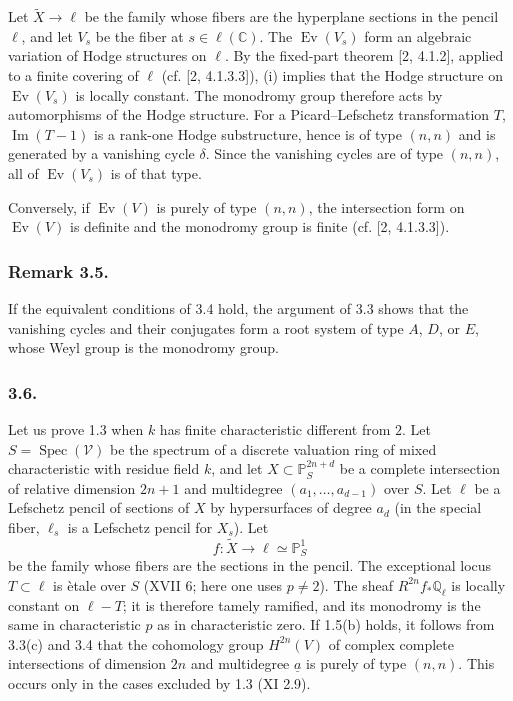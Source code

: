 Let $\widetilde X\to\ell$ be the family whose fibers are the hyperplane
sections in the pencil $\ell$, and let $V_s$ be the fiber at
$s\in\ell(\mathbb C)$.  The $\operatorname{Ev}(V_s)$ form an algebraic
variation of Hodge structures on $\ell$.  By the fixed-part theorem
[2, 4.1.2], applied to a finite covering of $\ell$ (cf. [2, 4.1.3.3]), (i)
implies that the Hodge structure on $\operatorname{Ev}(V_s)$ is locally
constant.  The monodromy group therefore acts by automorphisms of the Hodge
structure.  For a Picard--Lefschetz transformation $T$,
$\operatorname{Im}(T-1)$ is a rank-one Hodge substructure, hence is of type
$(n,n)$ and is generated by a vanishing cycle $\delta$.  Since the
vanishing cycles are of type $(n,n)$, all of
$\operatorname{Ev}(V_s)$ is of that type.

Conversely, if $\operatorname{Ev}(V)$ is purely of type $(n,n)$, the
intersection form on $\operatorname{Ev}(V)$ is definite and the monodromy
group is finite (cf. [2, 4.1.3.3]).

\subsubsection*{Remark 3.5.}
If the equivalent conditions of 3.4 hold, the argument of 3.3 shows that
the vanishing cycles and their conjugates form a root system of type $A$,
$D$, or $E$, whose Weyl group is the monodromy group.

\subsubsection*{3.6.}
Let us prove 1.3 when $k$ has finite characteristic different from $2$.
Let $S=\operatorname{Spec}(\mathcal V)$ be the spectrum of a discrete
valuation ring of mixed characteristic with residue field $k$, and let
$X\subset\mathbb P_S^{2n+d}$ be a complete intersection of relative
dimension $2n+1$ and multidegree $(a_1,\ldots,a_{d-1})$ over $S$.  Let
$\ell$ be a Lefschetz pencil of sections of $X$ by hypersurfaces of degree
$a_d$ (in the special fiber, $\ell_s$ is a Lefschetz pencil for $X_s$).
Let
\[
  f:\widetilde X\longrightarrow\ell\simeq\mathbb P^1_S
\]
be the family whose fibers are the sections in the pencil.  The exceptional
locus $T\subset\ell$ is \`etale over $S$ (XVII 6; here one uses
$p\ne2$).  The sheaf $R^{2n}f_*\mathbb Q_\ell$ is locally constant on
$\ell-T$; it is therefore tamely ramified, and its monodromy is the same in
characteristic $p$ as in characteristic zero.  If 1.5(b) holds, it follows
from 3.3(c) and 3.4 that the cohomology group $H^{2n}(V)$ of complex
complete intersections of dimension $2n$ and multidegree
$\underline a$ is purely of type $(n,n)$.  This occurs only in the cases
excluded by 1.3 (XI 2.9).

